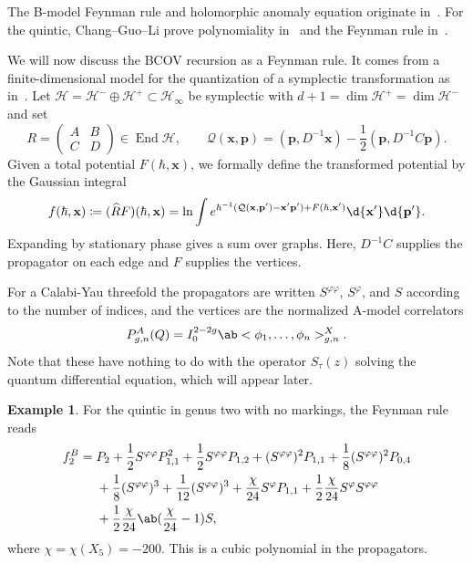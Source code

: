 \documentclass{amsart}
\theoremstyle{definition}
\newtheorem{exm}[thm]{Example}
\theoremstyle{remark}
\theoremstyle{plain}
\theoremstyle{definition}
\theoremstyle{remark}
\newcommand{\mc}[1]{\mathcal{#1}}
\newcommand{\mbf}[1]{\mathbf{#1}}
\newcommand{\bp}{\mbf{p}}
\newcommand{\wh}[1]{\widehat{#1}}
\newcommand{\1}{\mathbf{1}}
\newcommand{\2}{\mathbf{2}}
\newcommand{\3}{\mathbf{3}}
\DeclareMathOperator{\End}{End}
\begin{document}
The B-model Feynman rule and holomorphic anomaly equation originate in~\cite{BCOV1994}. For the quintic, Chang--Guo--Li prove polynomiality in~\cite{CGL2021} and the Feynman rule in~\cite{CGL2026}.

We will now discuss the BCOV recursion as a Feynman rule. It comes from a finite-dimensional model for the quantization of a symplectic transformation as in~. Let \(\mc{H} = \mc{H}^- \oplus \mc{H}^+ \subset \mc{H}_{\infty}\) be symplectic with \(d+1 = \dim \mc{H}^+ = \dim \mc{H}^-\) and set
\[ R = \begin{pmatrix} A & B \\ C & D \end{pmatrix} \in \End \mc{H}, \qquad \mc{Q}(\mbf{x},\bp) = (\bp, D^{-1}\mbf{x}) - \frac{1}{2}(\bp, D^{-1}C\bp). \]
Given a total potential \(F(\hbar, \mbf{x})\), we formally define the transformed potential by the Gaussian integral
\[ f(\hbar, \mbf{x}) \coloneqq (\wh{R}F)(\hbar,\mbf{x}) = \ln \int e^{\hbar^{-1}(\mc{Q}(\mbf{x},\bp') - \mbf{x}'\bp') + F(\hbar,\mbf{x}')}\d{\mbf{x}'}\d{\bp'}. \]
Expanding by stationary phase gives a sum over graphs. Here, \(D^{-1}C\) supplies the propagator on each edge and \(F\) supplies the vertices.

For a Calabi-Yau threefold the propagators are written \(S^{\varphi\varphi}\), \(S^{\varphi}\), and \(S\) according to the number of indices, and the vertices are the normalized A-model correlators
\[ P^A_{g,n}(Q) = I_0^{2-2g}\ab<\phi_1, \ldots, \phi_n>^X_{g,n}. \]
Note that these have nothing to do with the operator \(S_{\tau}(z)\) solving the quantum differential equation, which will appear later.

\begin{exm}
    For the quintic in genus two with no markings, the Feynman rule reads
    \begin{align*}
        f_2^B ={}& P_2 + \frac{1}{2}S^{\varphi\varphi}P_{1,1}^2 + \frac{1}{2}S^{\varphi\varphi}P_{1,2} + (S^{\varphi\varphi})^2 P_{1,1} + \frac{1}{8}(S^{\varphi\varphi})^2 P_{0,4} \\
        &+ \frac{1}{8}(S^{\varphi\varphi})^3 + \frac{1}{12}(S^{\varphi\varphi})^3 + \frac{\chi}{24}S^{\varphi}P_{1,1} + \frac{1}{2}\frac{\chi}{24}S^{\varphi}S^{\varphi\varphi} \\
        &+ \frac{1}{2}\frac{\chi}{24}\ab(\frac{\chi}{24}-1)S,
    \end{align*}
    where \(\chi = \chi(X_5) = -200\). This is a cubic polynomial in the propagators.
\end{exm}
\end{document}
